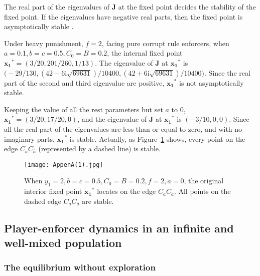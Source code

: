 \documentclass[letterpaper,10pt]{article}
\numberwithin{equation}{section}
\begin{document}
The real part of the eigenvalues of $ \mathbf{J} $ at the fixed point decides the stability of the fixed point. If the eigenvalues have negative real parts, then the fixed point is asymptotically stable \cite{sandholm2010local, hines1980three}.

Under heavy punishment, $ f = 2 $, facing pure corrupt rule enforcers, when $ a = 0.1, b=c=0.5, C_{0} = B = 0.2 $, the internal fixed point $ \mathbf{x_1}^* = (3/20, 201/260, 1/13) $. The eigenvalue of $ \mathbf{J} $ at $ \mathbf{x_1}^* $ is $ \bigl(-29/130,(42-6 \mathrm{i} \sqrt{69631})/10400,(42+6 \mathrm{i} \sqrt{69631})/10400\bigr) $. Since the real part of the second and third eigenvalue are positive, $ \mathbf{x_1}^* $ is not asymptotically stable.

Keeping the value of all the rest parameters but set $ a $ to $ 0 $, $ \mathbf{x_1}^* = (3/20, 17/20, 0) $, and the eigenvalue of $ \mathbf{J} $ at $ \mathbf{x_1}^* $ is $ (-3/10,0,0) $. Since all the real part of the eigenvalues are less than or equal to zero, and with no imaginary parts, $ \mathbf{x_1}^* $ is stable. Actually, as Figure~\ref{FigAppenA1} shows, every point on the edge $ C_{a}C_{\bar{a}} $ (represented by a dashed line) is stable.
    
    \begin{figure}[H]
        \centering
        \texttt{[image: AppenA(1).jpg]}
        \caption{When $ y_{1} = 2, b=c=0.5, C_{0} = B = 0.2, f = 2, a = 0 $, the original interior fixed point $ \mathbf{x_1}^* $ locates on the edge $ C_{a} C_{\bar{a}} $. All points on the dashed edge $ C_{a}C_{\bar{a}} $ are stable.}
        \label{FigAppenA1}
    \end{figure}

\subsection{Player-enforcer dynamics in an infinite and well-mixed population}\label{AppendixA2} %
\subsubsection{The equilibrium without exploration}\label{AppendixA21}
\end{document}
